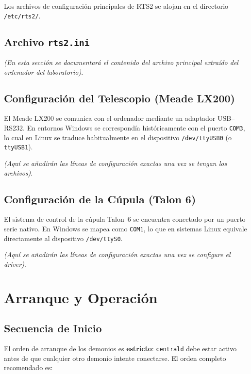 \documentclass[12pt,a4paper,titlepage]{article}
\begin{document}
Los archivos de configuración principales de RTS2 se alojan en el directorio \texttt{/etc/rts2/}.

\subsection{Archivo \texttt{rts2.ini}}
\textit{(En esta sección se documentará el contenido del archivo principal extraído del ordenador del laboratorio)}.

\subsection{Configuración del Telescopio (Meade LX200)}
El Meade LX200 se comunica con el ordenador mediante un adaptador USB--RS232. En entornos Windows se correspondía históricamente con el puerto \texttt{COM3}, lo cual en Linux se traduce habitualmente en el dispositivo \texttt{/dev/ttyUSB0} (o \texttt{ttyUSB1}).

\textit{(Aquí se añadirán las líneas de configuración exactas una vez se tengan los archivos)}.

\subsection{Configuración de la Cúpula (Talon 6)}
El sistema de control de la cúpula Talon~6 se encuentra conectado por un puerto serie nativo. En Windows se mapea como \texttt{COM1}, lo que en sistemas Linux equivale directamente al dispositivo \texttt{/dev/ttyS0}.

\textit{(Aquí se añadirán las líneas de configuración exactas una vez se configure el driver)}.

\section{Arranque y Operación}

\subsection{Secuencia de Inicio}

El orden de arranque de los demonios es \textbf{estricto}: \texttt{centrald} debe estar activo antes de que cualquier otro demonio intente conectarse. El orden completo recomendado es:
\end{document}
